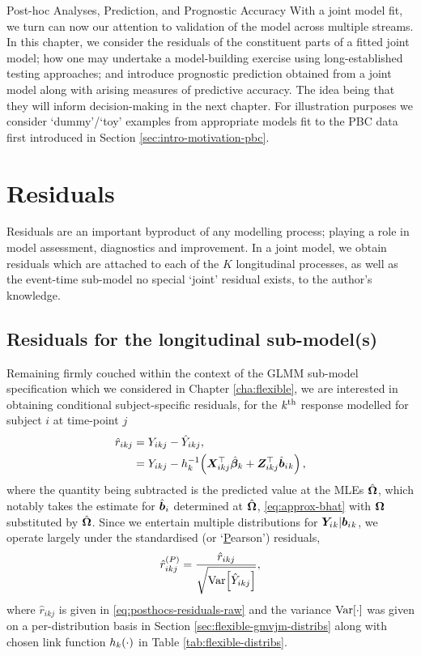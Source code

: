 \begin{chapter}{\label{cha:posthoc}Post-hoc Analyses, Prediction, and Prognostic Accuracy}
With a joint model fit, we turn can now our attention to validation of the model across multiple streams. In this chapter, we consider the residuals of the constituent parts of a fitted joint model; how one may undertake a model-building exercise using long-established testing approaches; and introduce prognostic prediction obtained from a joint model along with arising measures of predictive accuracy. The idea being that they will inform decision-making in the next chapter. For illustration purposes we consider `dummy'/`toy' examples from appropriate models fit to the PBC data first introduced in Section \ref{sec:intro-motivation-pbc}. 

\section{Residuals}\label{sec:posthoc-residuals-intro}
Residuals are an important byproduct of any modelling process; playing a role in model assessment, diagnostics and improvement. In a joint model, we obtain residuals which are attached to each of the $K$ longitudinal processes, as well as the event-time sub-model \ie no special `joint' residual exists, to the author's knowledge.
\subsection{Residuals for the longitudinal sub-model(s)}\label{sec:posthoc-residuals-long}
Remaining firmly couched within the context of the GLMM sub-model specification which we considered in Chapter \ref{cha:flexible}, we are interested in obtaining conditional subject-specific residuals, for the $k^{\text{th}}$ response modelled for subject $i$ at time-point $j$
\begin{equation}
    \begin{aligned}
        \hat{r}_{ikj} &= Y_{ikj} - \hat{Y}_{ikj},\\
        &= Y_{ikj} - h_k^{-1}\!\left(\bm{X}_{ikj}^\top\hat{\bm{\beta}}_k+\bm{Z}_{ikj}^\top\hat{\bm{b}}_i{_k}\right),
    \end{aligned}
\label{eq:posthocs-residuals-raw}
\end{equation}
where the quantity being subtracted is the predicted value at the MLEs $\hat{\bm{\Omega}}$, which notably takes the estimate for $\hat{\bm{b}}_i$ determined at $\hat{\bm{\Omega}}$, \ie \eqref{eq:approx-bhat} with $\bm{\mathrm{\Omega}}$ substituted by $\hat{\bm{\Omega}}$. Since we entertain multiple distributions for $\bm{Y}_i{_k}|\bm{b}_i{_k}$, we operate largely under the standardised (or `\underline{P}earson') residuals, 
\begin{align}
    \hat{r}_{ikj}^{(P)}=\frac{\hat{r}_{ikj}}{\sqrt{\mathrm{Var}\!\left[\hat{Y}_{ikj}\right]}},
\label{eq:posthocs-residuals-pearson}
\end{align}
where $\hat{r}_{ikj}$ is given in \eqref{eq:posthocs-residuals-raw} and the variance $\mathrm{Var}\!\left[\cdot\right]$ was given on a per-distribution basis in Section \ref{sec:flexible-gmvjm-distribs} along with chosen link function $h_k\!\left(\cdot\right)$ in Table \ref{tab:flexible-distribs}.


\end{chapter}
